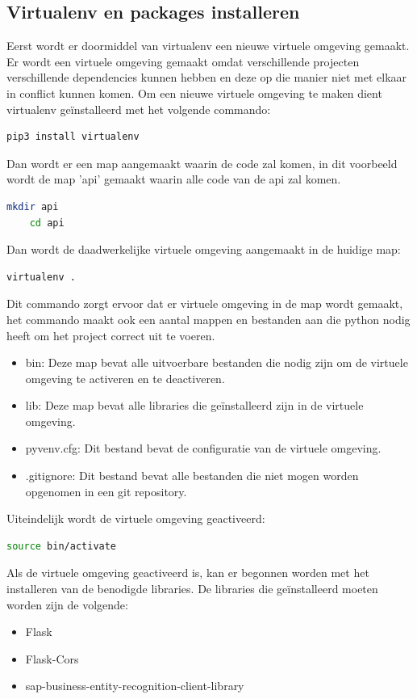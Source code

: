 \subsection{Virtualenv en packages installeren}
Eerst wordt er doormiddel van virtualenv een nieuwe virtuele omgeving gemaakt. Er wordt een virtuele omgeving gemaakt omdat verschillende projecten verschillende dependencies kunnen hebben en deze op die manier niet met elkaar in conflict kunnen komen. Om een nieuwe virtuele omgeving te maken dient virtualenv geïnstalleerd met het volgende commando:
\begin{lstlisting}[language=bash]
    pip3 install virtualenv
\end{lstlisting}

Dan wordt er een map aangemaakt waarin de code zal komen, in dit voorbeeld wordt de map 'api' gemaakt waarin alle code van de api zal komen.
\begin{lstlisting}[language=bash]
    mkdir api
    cd api
\end{lstlisting}

Dan wordt de daadwerkelijke virtuele omgeving aangemaakt in de huidige map:

\begin{lstlisting}[language=bash]
    virtualenv .
\end{lstlisting}

Dit commando zorgt ervoor dat er virtuele omgeving in de map wordt gemaakt, het commando maakt ook een aantal mappen en bestanden aan die python nodig heeft om het project correct uit te voeren.
\begin{itemize}
    \item bin: Deze map bevat alle uitvoerbare bestanden die nodig zijn om de virtuele omgeving te activeren en te deactiveren.
    \item lib: Deze map bevat alle libraries die geïnstalleerd zijn in de virtuele omgeving.
    \item pyvenv.cfg: Dit bestand bevat de configuratie van de virtuele omgeving.
    \item .gitignore: Dit bestand bevat alle bestanden die niet mogen worden opgenomen in een git repository.
\end{itemize}

Uiteindelijk wordt de virtuele omgeving geactiveerd:
\begin{lstlisting}[language=bash]
    source bin/activate
\end{lstlisting}

Als de virtuele omgeving geactiveerd is, kan er begonnen worden met het installeren van de benodigde libraries. De libraries die geïnstalleerd moeten worden zijn de volgende:
\begin{itemize}
    \item Flask
    \item Flask-Cors
    \item sap-business-entity-recognition-client-library
\end{itemize}

